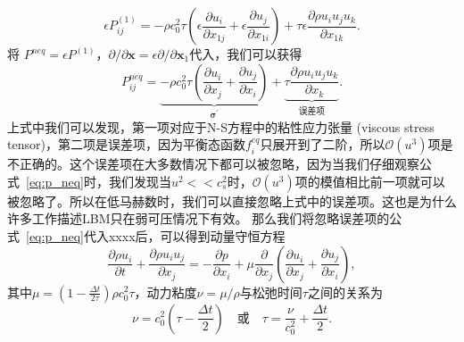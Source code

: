 \begin{equation}
\epsilon P_{i j}^{(1)}=-\rho c_{0}^{2} \tau\left(\epsilon \frac{\partial u_{i}}{\partial x_{1 j}}+\epsilon \frac{\partial u_{j}}{\partial x_{1 i}}\right)+\tau \epsilon \frac{\partial \rho u_{i} u_{j} u_{k}}{\partial x_{1 k}}.
\end{equation}
将 $P^{n e q}=\epsilon P^{(1)}$，$\partial / \partial \boldsymbol{x}=\epsilon \partial / \partial \boldsymbol{x}_{1}$代入，我们可以获得
\begin{equation}
P_{i j}^{n e q}=\underbrace{-\rho c_{0}^{2} \tau\left(\frac{\partial u_{i}}{\partial x_{j}}+\frac{\partial u_{j}}{\partial x_{i}}\right)}_{\boldsymbol{\sigma}^{\prime}}+\underbrace{\tau \frac{\partial \rho u_{i} u_{j} u_{k}}{\partial x_{k}}}_{\text {误差项}} .
\label{eq:p_neq}
\end{equation}
上式中我们可以发现，第一项对应于N-S方程中的粘性应力张量 (viscous stress tensor)，第二项是误差项，因为平衡态函数$f_i^{eq}$只展开到了二阶，所以$\mathcal{O}\left(u^{3}\right)$项是不正确的。这个误差项在大多数情况下都可以被忽略，因为当我们仔细观察公式~\ref{eq:p_neq}时，我们发现当$u^{2}<<c_{s}^{2}$时，$\mathcal{O}\left(u^{3}\right)$项的模值相比前一项就可以被忽略了。所以在低马赫数时，我们可以直接忽略上式中的误差项。这也是为什么许多工作描述LBM只在弱可压情况下有效。
那么我们将忽略误差项的公式~\ref{eq:p_neq}代入xxxx后，可以得到动量守恒方程
\begin{equation}
    \frac{\partial \rho u_{i}}{\partial t}+\frac{\partial \rho u_{i} u_{j}}{\partial x_{j}}=-\frac{\partial p}{\partial x_{i}}+\mu \frac{\partial}{\partial x_{j}}\left(\frac{\partial u_{i}}{\partial x_{j}}+\frac{\partial u_{j}}{\partial x_{i}}\right),
\end{equation}
其中$\mu=\left(1-\frac{\Delta t}{2 \tau}\right) \rho c_{0}^{2} \tau$，动力粘度$\nu=\mu / \rho$与松弛时间$\tau$之间的关系为
\begin{equation}
    \nu=c_{0}^{2}\left(\tau-\frac{\Delta t}{2}\right) \quad \text {或} \quad \tau=\frac{\nu}{c_{0}^{2}}+\frac{\Delta t}{2} .
\end{equation}